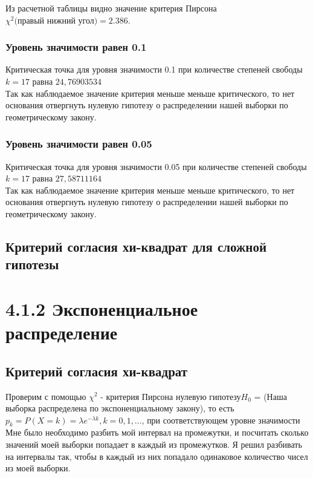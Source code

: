\documentclass[a4paper,12pt, oneside]{book}
\begin{document}
\newpage
Из расчетной таблицы видно значение критерия Пирсона $ \chi^2 \text{(правый нижний угол)} = 2.386$. 

\subsubsection{Уровень значимости равен 0.1}

Критическая точка для уровня значимости 0.1 при количестве степеней свободы $ k = 17 $ равна $24,76903534$\\

Так как наблюдаемое значение критерия меньше меньше критического, то нет основания отвергнуть нулевую гипотезу о распределении нашей выборки по геометрическому закону.  



\subsubsection{Уровень значимости равен 0.05} 

Критическая точка для уровня значимости 0.05 при количестве степеней свободы $ k = 17 $ равна $27,58711164$\\

Так как наблюдаемое значение критерия меньше меньше критического, то нет основания отвергнуть нулевую гипотезу о распределении нашей выборки по геометрическому закону.  


\newpage
\subsection{Критерий согласия хи-квадрат для сложной гипотезы}


\newpage
\section{4.1.2 Экспоненциальное распределение}


\subsection{Критерий согласия хи-квадрат}

Проверим с помощью $ \chi^2 $  - критерия Пирсона нулевую гипотезу$ H_0 $ = (Наша выборка распределена по экспоненциальному закону), то есть $ p_k = P(X = k ) = \lambda e^{-\lambda k}, k = 0,1, \ldots $, при соответствующем уровне значимости\\ 

Мне было необходимо разбить мой интервал на промежутки, и посчитать сколько значений моей выборки попадает в каждый из промежутков. Я решил разбивать на интервалы так, чтобы в каждый из них попадало одинаковое количество чисел из моей выборки.\\
\end{document}
